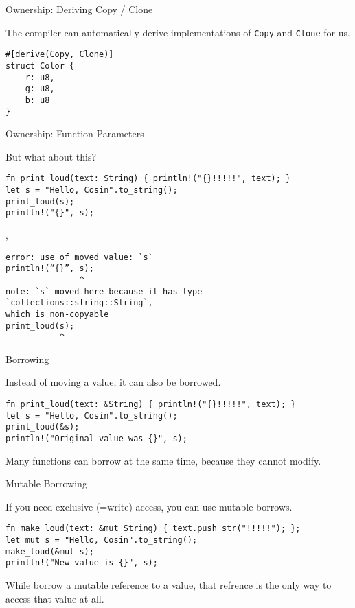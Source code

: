 
\begin{frame}[fragile]{Ownership: Deriving Copy / Clone}

The compiler can automatically derive implementations of \texttt{Copy} and
\texttt{Clone} for us.

\begin{verbatim}
#[derive(Copy, Clone)]
struct Color {
    r: u8,
    g: u8,
    b: u8
}
\end{verbatim}

\end{frame}


\begin{frame}[fragile]{Ownership: Function Parameters}

But what about this?

\begin{verbatim}
fn print_loud(text: String) { println!("{}!!!!!", text); }
let s = "Hello, Cosin".to_string();
print_loud(s);
println!("{}", s);
\end{verbatim}

\pause
\sep

\begin{verbatim}
error: use of moved value: `s`
println!(“{}”, s);
               ^
note: `s` moved here because it has type `collections::string::String`,
which is non-copyable
print_loud(s);
           ^
\end{verbatim}

\end{frame}


\begin{frame}[fragile]{Borrowing}

Instead of moving a value, it can also be borrowed.

\begin{verbatim}
fn print_loud(text: &String) { println!("{}!!!!!", text); }
let s = "Hello, Cosin".to_string();
print_loud(&s);
println!("Original value was {}", s);
\end{verbatim}

Many functions can borrow at the same time, because they cannot modify.

\end{frame}


\begin{frame}[fragile]{Mutable Borrowing}

If you need exclusive (=write) access, you can use mutable borrows.

\begin{verbatim}
fn make_loud(text: &mut String) { text.push_str("!!!!!"); };
let mut s = "Hello, Cosin".to_string();
make_loud(&mut s);
println!("New value is {}", s);
\end{verbatim}

While borrow a mutable reference to a value, that refrence is the only way to
access that value at all.

\end{frame}

